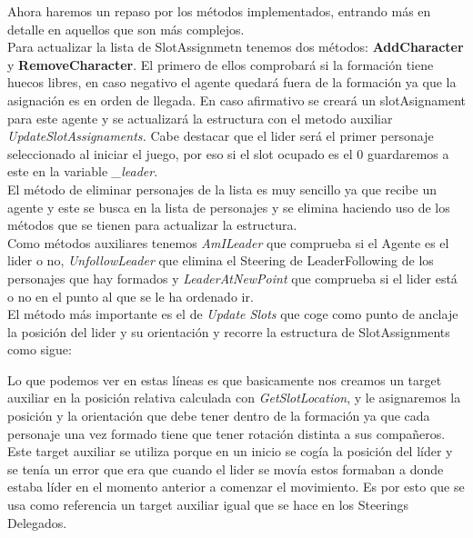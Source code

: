 Ahora haremos un repaso por los métodos implementados, entrando más en detalle en aquellos que son más complejos.\\

Para actualizar la lista de SlotAssignmetn tenemos dos métodos: \textbf{AddCharacter} y \textbf{RemoveCharacter}. El primero de ellos comprobará si la formación tiene huecos libres, en caso negativo el agente quedará fuera de la formación ya que la asignación es en orden de llegada. En caso afirmativo se creará un slotAsignament para este agente y se actualizará la estructura con el metodo auxiliar \textit{UpdateSlotAssignaments.} Cabe destacar que el lider será el primer personaje seleccionado al iniciar el juego, por eso si el slot ocupado es el 0 guardaremos a este en la variable \textit{\_leader}.\\

El método de eliminar personajes de la lista es muy sencillo ya que recibe un agente y este se busca en la lista de personajes y se elimina haciendo uso de los métodos que se tienen para actualizar la estructura.\\

Como métodos auxiliares tenemos \textit{AmILeader} que comprueba si el Agente es el lider o no, \textit{UnfollowLeader} que elimina el Steering de LeaderFollowing de los personajes que hay formados y \textit{LeaderAtNewPoint} que comprueba si el lider está o no en el punto al que se le ha ordenado ir.\\

El método más importante es el de \textit{Update Slots} que coge como punto de anclaje la posición del lider y su orientación y recorre la estructura de SlotAssignments como sigue: 



Lo que podemos ver en estas líneas es que basicamente nos creamos un target auxiliar en la posición relativa calculada con \textit{GetSlotLocation}, y le asignaremos la posición y la orientación que debe tener dentro de la formación ya que cada personaje una vez formado tiene que tener rotación distinta a sus compañeros. Este target auxiliar se utiliza porque en un inicio se cogía la posición del líder y se tenía un error que era que cuando el lider se movía estos formaban a donde estaba líder en el momento anterior a comenzar el movimiento. Es por esto que se usa como referencia un target auxiliar igual que se hace en los Steerings Delegados.\\

